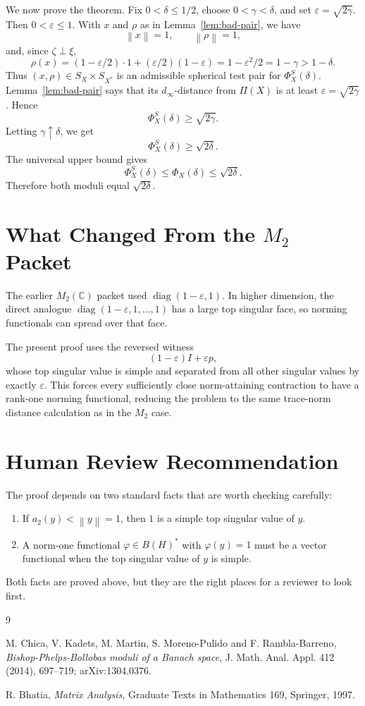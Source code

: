 \documentclass[11pt]{article}
\newcommand{\norm}[1]{\left\lVert #1 \right\rVert}
\newcommand{\eps}{\varepsilon}
\begin{document}
We now prove the theorem. Fix \(0<\delta\leq1/2\), choose
\(0<\gamma<\delta\), and set \(\eps=\sqrt{2\gamma}\). Then
\(0<\eps\le1\). With \(x\) and \(\rho\) as in Lemma~\ref{lem:bad-pair},
we have
\[
  \norm{x}=1,\qquad \norm{\rho}=1,
\]
and, since \(\zeta\perp\xi\),
\[
  \rho(x)
  =(1-\eps/2)\cdot 1+(\eps/2)(1-\eps)
  =1-\eps^2/2
  =1-\gamma
  >1-\delta .
\]
Thus \((x,\rho)\in S_X\times S_{X^*}\) is an admissible spherical test pair
for \(\Phi_X^S(\delta)\). Lemma~\ref{lem:bad-pair} says that its
\(d_\infty\)-distance from \(\Pi(X)\) is at least \(\eps=\sqrt{2\gamma}\).
Hence
\[
  \Phi_X^S(\delta)\geq\sqrt{2\gamma}.
\]
Letting \(\gamma\uparrow\delta\), we get
\[
  \Phi_X^S(\delta)\geq\sqrt{2\delta}.
\]
The universal upper bound gives
\[
  \Phi_X^S(\delta)\leq\Phi_X(\delta)\leq\sqrt{2\delta}.
\]
Therefore both moduli equal \(\sqrt{2\delta}\).

\section*{What Changed From the \(M_2\) Packet}

The earlier \(M_2(\mathbb C)\) packet used
\(\operatorname{diag}(1-\eps,1)\). In higher dimension, the direct analogue
\(\operatorname{diag}(1-\eps,1,\ldots,1)\) has a large top singular face,
so norming functionals can spread over that face.

The present proof uses the reversed witness
\[
  (1-\eps)I+\eps p,
\]
whose top singular value is simple and separated from all other singular
values by exactly \(\eps\). This forces every sufficiently close
norm-attaining contraction to have a rank-one norming functional, reducing
the problem to the same trace-norm distance calculation as in the \(M_2\)
case.

\section*{Human Review Recommendation}

The proof depends on two standard facts that are worth checking carefully:

\begin{enumerate}
\item If \(a_2(y)<\norm{y}=1\), then \(1\) is a simple top singular value
of \(y\).
\item A norm-one functional \(\varphi\in B(H)^*\) with \(\varphi(y)=1\)
must be a vector functional when the top singular value of \(y\) is simple.
\end{enumerate}

Both facts are proved above, but they are the right places for a reviewer to
look first.

\begin{thebibliography}{9}

M. Chica, V. Kadets, M. Martin, S. Moreno-Pulido and F. Rambla-Barreno,
\emph{Bishop-Phelps-Bollobas moduli of a Banach space},
J. Math. Anal. Appl. 412 (2014), 697--719; arXiv:1304.0376.

R. Bhatia,
\emph{Matrix Analysis},
Graduate Texts in Mathematics 169, Springer, 1997.

\end{thebibliography}
\end{document}
